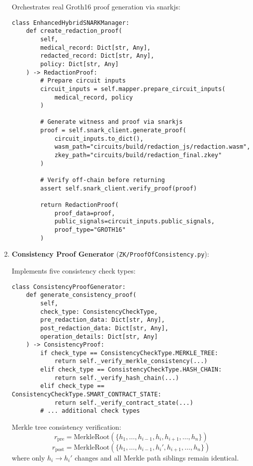 \begin{enumerate}
    Orchestrates real Groth16 proof generation via snarkjs:
    
    \begin{verbatim}
class EnhancedHybridSNARKManager:
    def create_redaction_proof(
        self,
        medical_record: Dict[str, Any],
        redacted_record: Dict[str, Any],
        policy: Dict[str, Any]
    ) -> RedactionProof:
        # Prepare circuit inputs
        circuit_inputs = self.mapper.prepare_circuit_inputs(
            medical_record, policy
        )
        
        # Generate witness and proof via snarkjs
        proof = self.snark_client.generate_proof(
            circuit_inputs.to_dict(),
            wasm_path="circuits/build/redaction_js/redaction.wasm",
            zkey_path="circuits/build/redaction_final.zkey"
        )
        
        # Verify off-chain before returning
        assert self.snark_client.verify_proof(proof)
        
        return RedactionProof(
            proof_data=proof,
            public_signals=circuit_inputs.public_signals,
            proof_type="GROTH16"
        )
\end{verbatim}
    
    \item \textbf{Consistency Proof Generator} (\texttt{ZK/ProofOfConsistency.py}):
    
    Implements five consistency check types:
    
    \begin{verbatim}
class ConsistencyProofGenerator:
    def generate_consistency_proof(
        self,
        check_type: ConsistencyCheckType,
        pre_redaction_data: Dict[str, Any],
        post_redaction_data: Dict[str, Any],
        operation_details: Dict[str, Any]
    ) -> ConsistencyProof:
        if check_type == ConsistencyCheckType.MERKLE_TREE:
            return self._verify_merkle_consistency(...)
        elif check_type == ConsistencyCheckType.HASH_CHAIN:
            return self._verify_hash_chain(...)
        elif check_type == ConsistencyCheckType.SMART_CONTRACT_STATE:
            return self._verify_contract_state(...)
        # ... additional check types
\end{verbatim}
    
    Merkle tree consistency verification:
    \begin{equation}
        r_{\text{pre}} = \text{MerkleRoot}(\{h_1, \ldots, h_{i-1}, h_i, h_{i+1}, \ldots, h_n\})
    \end{equation}
    \begin{equation}
        r_{\text{post}} = \text{MerkleRoot}(\{h_1, \ldots, h_{i-1}, h_i', h_{i+1}, \ldots, h_n\})
    \end{equation}
    where only $h_i \to h_i'$ changes and all Merkle path siblings remain identical.
    

\end{enumerate}
